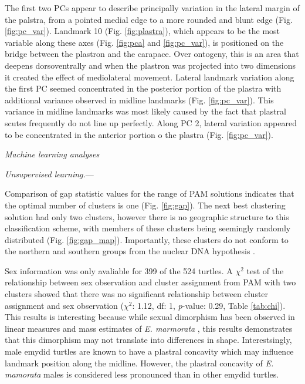 \documentclass[12pt,letterpaper]{article}\usepackage{graphicx, color}
\renewcommand{\subsection}[1]{%
\bigskip
\begin{center}
\begin{large}
\normalfont\itshape #1
\end{large}
\end{center}}
\renewcommand{\subsubsection}[1]{%
\vspace{2ex}
\noindent
\textit{#1.}---}
\begin{document}
The first two PCs appear to describe principally variation in the lateral margin of the palstra, from a pointed medial edge to a more rounded and blunt edge (Fig. \ref{fig:pc_var}). Landmark 10 (Fig. \ref{fig:plastra}), which appears to be the most variable along these axes (Fig. \ref{fig:pca} and \ref{fig:pc_var}), is positioned on the bridge between the plastron and the carapace. Over ontogeny, this is an area that deepens dorsoventrally and when the plastron was projected into two dimensions it created the effect of mediolateral movement.
Lateral landmark variation along the first PC seemed concentrated in the posterior portion of the plastra with additional variance observed in midline landmarks (Fig. \ref{fig:pc_var}). This variance in midline landmarks was most likely caused by the fact that plastral scutes frequently do not line up perfectly. Along PC 2, lateral variation appeared to be concentrated in the anterior portion o the plastra (Fig. \ref{fig:pc_var}).



\subsection{Machine learning analyses}
\subsubsection{Unsupervised learning}

Comparison of gap statistic values for the range of PAM solutions indicates that the optimal number of clusters is one (Fig. \ref{fig:gap}). The next best clustering solution had only two clusters, however there is no geographic structure to this classification scheme, with members of these clusters being seemingly randomly distributed (Fig. \ref{fig:gap_map}). Importantly, these clusters do not conform to the northern and southern groups from the nuclear DNA hypothesis \citep{Spinks2010}.

Sex information was only avaliable for 399 of the 524 turtles. A \(\chi^{2}\) test of the relationship between sex observation and cluster assignment from PAM with two clusters showed that there was no significant relationship between cluster assignment and sex observation (\(\chi^{2}\): 1.12, df: 1, \textit{p}-value: 0.29, Table \ref{tab:chi}). This results is interesting because while sexual dimorphism has been observed in linear measures and mass estimates of \textit{E. marmorata} \citep{Lubcke2007,Germano2009,Holland1992}, this results demonstrates that this dimorphism may not translate into differences in shape. Interestsingly, male emydid turtles are known to have a plastral concavity which may influence landmark position along the midline. However, the plastral concavity of \textit{E. mamorata} males is considered less pronounced than in other emydid turtles.
\end{document}
